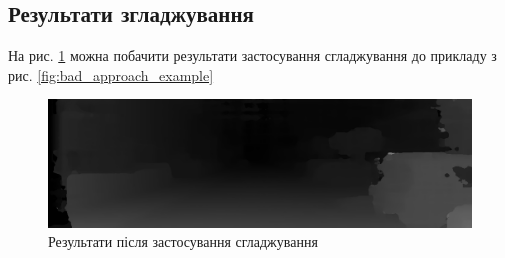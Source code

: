 \documentclass{article}
\theoremstyle{definition}
\begin{document}
\subsection{Результати згладжування}
На рис. \ref{fig:smoothing_result} можна побачити результати застосування сгладжування до прикладу з рис. \ref{fig:bad_approach_example}
\begin{figure}[h]
	\includegraphics[width=\linewidth]{smoothing_result}
	\centering
	\caption{Результати після застосування сгладжування}
	\label{fig:smoothing_result}
\end{figure}

\newpage

\printbibliography 
\end{document}
